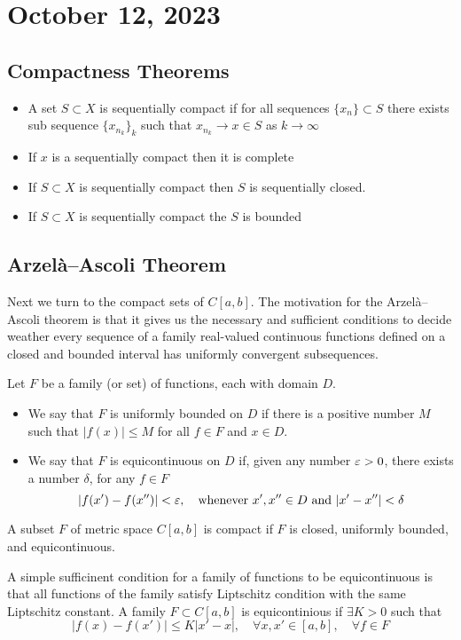 \newpage
\section{October 12, 2023}
\subsection{Compactness Theorems}
\begin{itemize}
    \item A set $S \subset X$ is sequentially compact if 
    for all sequences $\{ x_n \} \subset S$ there exists sub sequence $\{x_{n_k}\}_k$ such that $x_{n_k} \to x \in S$ as $ k \to \infty$ 
    \item If $x$ is a sequentially compact then it is complete
    \item If $S \subset X$ is sequentially compact then $S$ is sequentially closed.
    \item If $S \subset X$ is sequentially compact the $S$ is bounded 
\end{itemize}
\subsection{Arzelà–Ascoli Theorem}
Next we turn to the compact sets of $C[a,b]$.
The motivation for the Arzelà–Ascoli theorem is that it gives us the necessary and sufficient conditions to decide weather every sequence of a family real-valued continuous functions defined on a closed and bounded interval has uniformly convergent subsequences. 

\begin{definition}
    Let $F$ be a family (or set) of functions, each with domain $D$.
    \begin{itemize}
        \item We say that $F$ is uniformly bounded on $D$ if there is a positive number $M$ such that $|f(x)| \leq M$ for all $f \in F$ and $x \in D$.
        \item We say that $F$ is equicontinuous on $D$ if, given any number $\varepsilon > 0$, there exists a number  $\delta$, for any $f \in F$
        $$
        |f(x') -f(x'') | < \varepsilon, \quad \text{whenever } x', x'' \in D
        \text{ and } |x' - x''| < \delta
        $$
    \end{itemize}
\end{definition}

\begin{theorem}
    A subset $F$ of metric space $C[a,b]$ is compact if $F$ is closed, uniformly bounded, and equicontinuous. 
\end{theorem}
A simple sufficinent condition for a family  of functions to be equicontinuous is that all functions of the family satisfy Liptschitz condition with the same Liptschitz constant.
A family $F \subset C[a,b]$ is equicontinious if $\exists K >0$ such that
$$
|f(x) - f(x')| \leq K|x' - x|, \quad \forall x, x' \in [a,b], \quad \forall f \in F
$$


